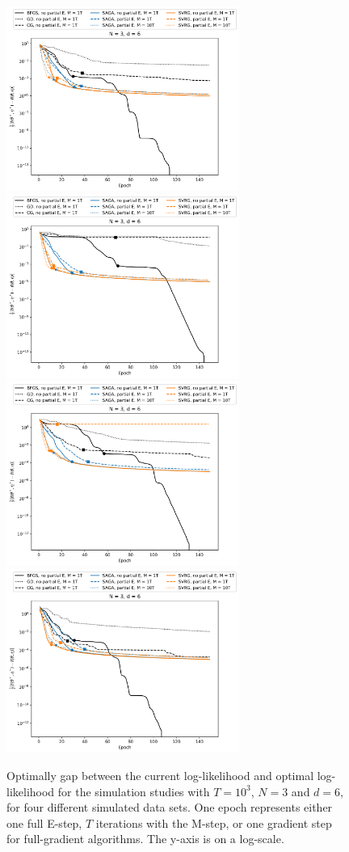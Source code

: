 \documentclass{article}
\begin{document}
%
\begin{figure}
    \centering
    \includegraphics[width=3in]{../plt/log-like_v_epoch_T-1000-K-3-1-d-6-001.png}
    \includegraphics[width=3in]{../plt/log-like_v_epoch_T-1000-K-3-1-d-6-002.png}
    \\
    \includegraphics[width=3in]{../plt/log-like_v_epoch_T-1000-K-3-1-d-6-003.png}
    \includegraphics[width=3in]{../plt/log-like_v_epoch_T-1000-K-3-1-d-6-004.png}   
    \caption{Optimally gap between the current log-likelihood and optimal log-likelihood for the simulation studies with $T=10^{3}$, $N=3$ and $d=6$, for four different simulated data sets. One epoch represents either one full E-step, $T$ iterations with the M-step, or one gradient step for full-gradient algorithms. The y-axis is on a log-scale.}
\end{figure}
\end{document}
